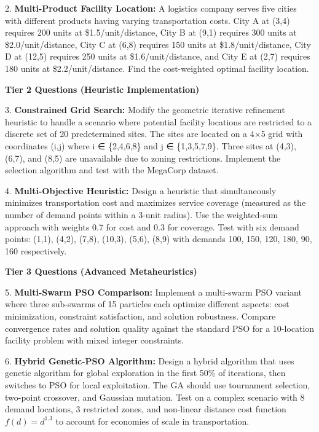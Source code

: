 \documentclass{article}
\begin{document}
2. \textbf{Multi-Product Facility Location:} A logistics company serves five cities with different products having varying transportation costs. City A at (3,4) requires 200 units at \$1.5/unit/distance, City B at (9,1) requires 300 units at \$2.0/unit/distance, City C at (6,8) requires 150 units at \$1.8/unit/distance, City D at (12,5) requires 250 units at \$1.6/unit/distance, and City E at (2,7) requires 180 units at \$2.2/unit/distance. Find the cost-weighted optimal facility location.

\textbf{Tier 2 Questions (Heuristic Implementation)}

3. \textbf{Constrained Grid Search:} Modify the geometric iterative refinement heuristic to handle a scenario where potential facility locations are restricted to a discrete set of 20 predetermined sites. The sites are located on a 4×5 grid with coordinates (i,j) where i ∈ \{2,4,6,8\} and j ∈ \{1,3,5,7,9\}. Three sites at (4,3), (6,7), and (8,5) are unavailable due to zoning restrictions. Implement the selection algorithm and test with the MegaCorp dataset.

4. \textbf{Multi-Objective Heuristic:} Design a heuristic that simultaneously minimizes transportation cost and maximizes service coverage (measured as the number of demand points within a 3-unit radius). Use the weighted-sum approach with weights 0.7 for cost and 0.3 for coverage. Test with six demand points: (1,1), (4,2), (7,8), (10,3), (5,6), (8,9) with demands 100, 150, 120, 180, 90, 160 respectively.

\textbf{Tier 3 Questions (Advanced Metaheuristics)}

5. \textbf{Multi-Swarm PSO Comparison:} Implement a multi-swarm PSO variant where three sub-swarms of 15 particles each optimize different aspects: cost minimization, constraint satisfaction, and solution robustness. Compare convergence rates and solution quality against the standard PSO for a 10-location facility problem with mixed integer constraints.

6. \textbf{Hybrid Genetic-PSO Algorithm:} Design a hybrid algorithm that uses genetic algorithm for global exploration in the first 50\% of iterations, then switches to PSO for local exploitation. The GA should use tournament selection, two-point crossover, and Gaussian mutation. Test on a complex scenario with 8 demand locations, 3 restricted zones, and non-linear distance cost function $f(d) = d^{1.3}$ to account for economies of scale in transportation.
\end{document}
